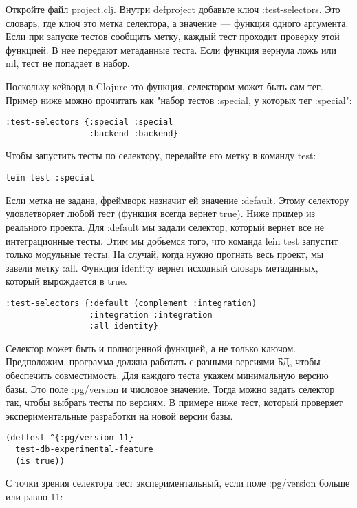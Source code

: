 Откройте файл project.clj. Внутри defproject добавьте ключ :test-selectors. Это
словарь, где ключ это метка селектора, а значение~--- функция одного
аргумента. Если при запуске тестов сообщить метку, каждый тест проходит проверку
этой функцией. В нее передают метаданные теста. Если функция вернула ложь или
nil, тест не попадает в набор.

Поскольку кейворд в Clojure это функция, селектором может быть сам тег. Пример
ниже можно прочитать как "набор тестов :special, у которых тег :special":

\begin{verbatim}
:test-selectors {:special :special
                 :backend :backend}
\end{verbatim}

Чтобы запустить тесты по селектору, передайте его метку в команду test:

\begin{verbatim}
lein test :special
\end{verbatim}

Если метка не задана, фреймворк назначит ей значение :default. Этому селектору
удовлетворяет любой тест (функция всегда вернет true). Ниже пример из реального
проекта. Для :default мы задали селектор, который вернет все не интеграционные
тесты. Этим мы добьемся того, что команда lein test запустит только модульные
тесты. На случай, когда нужно прогнать весь проект, мы завели метку
:all. Функция identity вернет исходный словарь метаданных, который вырождается в
true.

\begin{verbatim}
:test-selectors {:default (complement :integration)
                 :integration :integration
                 :all identity}
\end{verbatim}

Селектор может быть и полноценной функцией, а не только ключом. Предположим,
программа должна работать с разными версиями БД, чтобы обеспечить
совместимость. Для каждого теста укажем минимальную версию базы. Это поле
:pg/version и числовое значение. Тогда можно задать селектор так, чтобы выбрать
тесты по версиям. В примере ниже тест, который проверяет экспериментальные
разработки на новой версии базы.

\begin{verbatim}
(deftest ^{:pg/version 11}
  test-db-experimental-feature
  (is true))
\end{verbatim}

С точки зрения селектора тест экспериментальный, если поле :pg/version больше
или равно 11:


